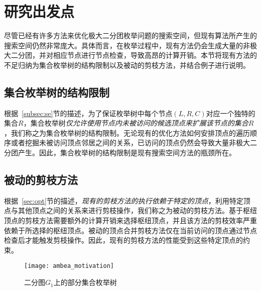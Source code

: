     


\section{研究出发点}
\label{sec:ambea_motivation}

尽管已经有许多方法来优化极大二分团枚举问题的搜索空间，但现有算法所产生的搜索空间仍然非常庞大。具体而言，在枚举过程中，现有方法仍会生成大量的非极大二分团，并对相应节点进行节点检查，导致高昂的计算开销。本节将现有方法的不足归纳为集合枚举树的结构限制以及被动的剪枝方法，并结合例子进行说明。


\subsection{集合枚举树的结构限制}

根据~\ref{subsec:se}节的描述，为了保证枚举树中每个节点$(L,R,C)$对应一个独特的集合$R$，集合枚举树\emph{仅允许使用节点内未被访问的候选顶点来扩展该节点的集合$R$}，我们称之为集合枚举树的结构限制。无论现有的优化方法如何安排顶点的遍历顺序或者挖掘未被访问顶点邻居之间的关系，已访问的顶点仍然会导致大量非极大二分团产生。因此，集合枚举树的结构限制是现有搜索空间方法的瓶颈所在。

\subsection{被动的剪枝方法}

根据~\ref{sec:opt}节的描述，\emph{现有的剪枝方法的执行依赖于特定的顶点}，利用特定顶点与其他顶点之间的关系来进行剪枝操作，我们称之为被动的剪枝方法。基于枢纽顶点的剪枝方法需要额外的计算开销来选择枢纽顶点，并且该方法的剪枝效率严重依赖于所选择的枢纽顶点。被动的顶点合并剪枝方法仅在当前访问的顶点通过节点检查后才能触发剪枝操作。因此，现有的剪枝方法的性能受到这些特定顶点的约束。

\begin{figure} [h]
  \centering
  \texttt{[image: ambea\_motivation]}
  \caption{二分图$G_1$上的部分集合枚举树}
  \label{fig:ambea_motivation}
\end{figure}

